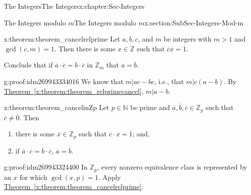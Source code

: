 \documentclass[oneside,10pt,]{book}
\numberwithin{equation}{section}
\def\Z{{\mathbb Z}}
\def\N{{\mathbb N}}
\begin{document}
\begin{chapterptx}{The Integers}{}{The Integers}{}{}{x:chapter:Sec-Integers}
\begin{sectionptx}{The Integers modulo \(m\)}{}{The Integers modulo \(m\)}{}{}{x:section:SubSec-Integers-Mod-m}
\begin{theorem}{}{}{x:theorem:theorem_cancelrelprime}
Let \(a,b,c\), and \(m\) be integers with \(m > 1\) and \(\gcd(c,m)=1\). Then there is some \(x\in \Z\) such that \(\overline{c} \overline{x} = \overline{1}\).%
\par
Conclude that if \(\overline{a} \cdot\overline{c} = \overline{b}\cdot\overline{c}\) in \(\Z_m\) that \(\overline{a} = \overline{b}\).%
\end{theorem}
\begin{proofptx}{}{g:proof:idm269943334016}
We know that \(m|ac-bc\), i.e., that \(m|c(a-b)\). By \hyperref[x:theorem:theorem_relprimecancel]{Theorem~\ref{x:theorem:theorem_relprimecancel}}, \(m|a-b\).%
\end{proofptx}
\begin{theorem}{}{}{x:theorem:theorem_cancelinZp}%
Let \(p\in \N\) be prime and \(\overline{a},\overline{b},\overline{c}\in \Z_p\) such that \(\overline{c}\ne \overline{0}\). Then%
\begin{enumerate}
\item{}there is some \(\overline{x}\in \Z_p\) such that \(\overline{c}\cdot \overline{x} = \overline{1}\); and,%
\item{}if \(\overline{a} \cdot\overline{c} = \overline{b}\cdot\overline{c}\), \(\overline{a} = \overline{b}\).%
\end{enumerate}
%
\end{theorem}
\begin{proofptx}{}{g:proof:idm269943324400}
In \(\Z_p\), every nonzero equivalence class is represented by an \(x\) for which \(\gcd(x,p) = 1\). Apply \hyperref[x:theorem:theorem_cancelrelprime]{Theorem~\ref{x:theorem:theorem_cancelrelprime}}.%
\end{proofptx}
\end{sectionptx}
\end{chapterptx}
%
%
\typeout{************************************************}
\typeout{************************************************}
%
\end{document}
